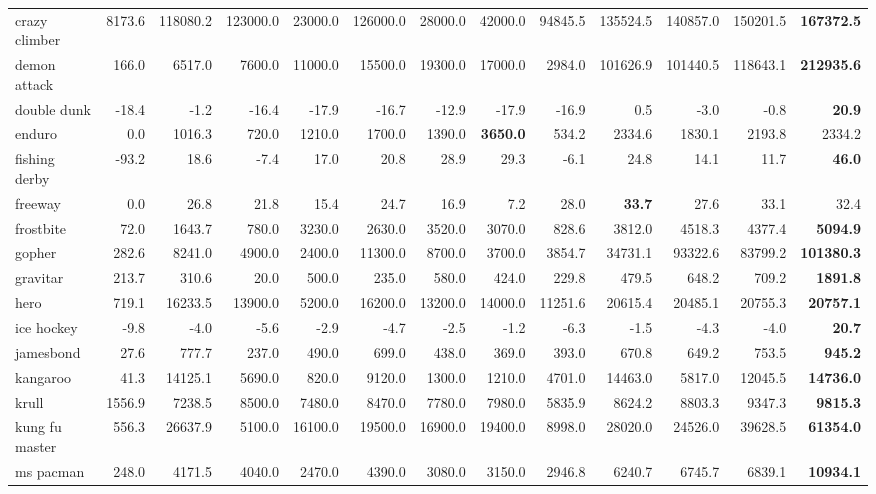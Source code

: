 \documentclass{article}
\begin{document}
\begin{table}
\begin{center}
\begin{tabularx}{1.05\textwidth}{X|rr|rrrrr|rrrr|r}
crazy climber  & 8173.6 & 118080.2 & 123000.0 & 23000.0 & 126000.0 & 28000.0 & 42000.0 & 94845.5 & 135524.5 & 140857.0 & 150201.5 & \textbf{167372.5} \\
demon attack  & 166.0 & 6517.0 & 7600.0 & 11000.0 & 15500.0 & 19300.0 & 17000.0 & 2984.0 & 101626.9 & 101440.5 & 118643.1 & \textbf{212935.6} \\
double dunk  & -18.4 & -1.2 & -16.4 & -17.9 & -16.7 & -12.9 & -17.9 & -16.9 & 0.5 & -3.0 & -0.8 & \textbf{20.9} \\
enduro  & 0.0 & 1016.3 & 720.0 & 1210.0 & 1700.0 & 1390.0 & \textbf{3650.0} & 534.2 & 2334.6 & 1830.1 & 2193.8 & 2334.2 \\
fishing derby  & -93.2 & 18.6 & -7.4 & 17.0 & 20.8 & 28.9 & 29.3 & -6.1 & 24.8 & 14.1 & 11.7 & \textbf{46.0} \\
freeway  & 0.0 & 26.8 & 21.8 & 15.4 & 24.7 & 16.9 & 7.2 & 28.0 & \textbf{33.7} & 27.6 & 33.1 & 32.4 \\
frostbite  & 72.0 & 1643.7 & 780.0 & 3230.0 & 2630.0 & 3520.0 & 3070.0 & 828.6 & 3812.0 & 4518.3 & 4377.4 & \textbf{5094.9} \\
gopher  & 282.6 & 8241.0 & 4900.0 & 2400.0 & 11300.0 & 8700.0 & 3700.0 & 3854.7 & 34731.1 & 93322.6 & 83799.2 & \textbf{101380.3} \\
gravitar  & 213.7 & 310.6 & 20.0 & 500.0 & 235.0 & 580.0 & 424.0 & 229.8 & 479.5 & 648.2 & 709.2 & \textbf{1891.8} \\
hero  & 719.1 & 16233.5 & 13900.0 & 5200.0 & 16200.0 & 13200.0 & 14000.0 & 11251.6 & 20615.4 & 20485.1 & 20755.3 & \textbf{20757.1} \\
ice hockey  & -9.8 & -4.0 & -5.6 & -2.9 & -4.7 & -2.5 & -1.2 & -6.3 & -1.5 & -4.3 & -4.0 & \textbf{20.7} \\
jamesbond  & 27.6 & 777.7 & 237.0 & 490.0 & 699.0 & 438.0 & 369.0 & 393.0 & 670.8 & 649.2 & 753.5 & \textbf{945.2} \\
kangaroo  & 41.3 & 14125.1 & 5690.0 & 820.0 & 9120.0 & 1300.0 & 1210.0 & 4701.0 & 14463.0 & 5817.0 & 12045.5 & \textbf{14736.0} \\
krull  & 1556.9 & 7238.5 & 8500.0 & 7480.0 & 8470.0 & 7780.0 & 7980.0 & 5835.9 & 8624.2 & 8803.3 & 9347.3 & \textbf{9815.3} \\
kung fu master  & 556.3 & 26637.9 & 5100.0 & 16100.0 & 19500.0 & 16900.0 & 19400.0 & 8998.0 & 28020.0 & 24526.0 & 39628.5 & \textbf{61354.0} \\
ms pacman  & 248.0 & 4171.5 & 4040.0 & 2470.0 & 4390.0 & 3080.0 & 3150.0 & 2946.8 & 6240.7 & 6745.7 & 6839.1 & \textbf{10934.1} \\

\end{tabularx}
\end{center}
\end{table}
\end{document}
